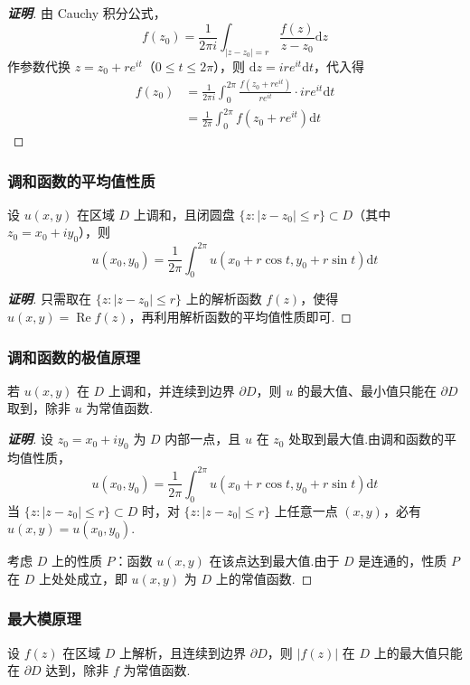 \documentclass[openany,oneside]{ctexbook}
\begin{document}
\begin{proof}[\textbf{证明}]
由 Cauchy 积分公式，
\[
f(z_0)=\frac{1}{2\pi i}\int_{|z-z_0|=r}\frac{f(z)}{z-z_0}\mathrm{d}z
\]
作参数代换 \( z=z_0+re^{it} \)（\( 0\le t\le 2\pi \)），则 \( \mathrm{d}z=ire^{it}\mathrm{d}t \)，代入得
\[
\begin{aligned}
f(z_0)&=\frac{1}{2\pi i}\int_0^{2\pi}\frac{f(z_0+re^{it})}{re^{it}}\cdot ire^{it}\mathrm{d}t\\
&=\frac{1}{2\pi}\int_0^{2\pi}f(z_0+re^{it})\mathrm{d}t
\end{aligned}
\]
\end{proof}
\subsubsection{调和函数的平均值性质}
\begin{theorem}
设 \( u(x,y) \) 在区域 \( D \) 上调和，且闭圆盘 \( \{z:|z-z_0|\le r\}\subset D \)（其中 \( z_0=x_0+iy_0 \)），则
\[
u(x_0,y_0)=\frac{1}{2\pi}\int_0^{2\pi}u(x_0+r\cos t,y_0+r\sin t)\mathrm{d}t
\]
\end{theorem}

\begin{proof}[\textbf{证明}]
只需取在 \( \{z:|z-z_0|\le r\} \) 上的解析函数 \( f(z) \)，使得 \( u(x,y)=\operatorname{Re}f(z) \)，再利用解析函数的平均值性质即可.
\end{proof}
\subsubsection{调和函数的极值原理}
\begin{theorem}
若 \( u(x,y) \) 在 \( D \) 上调和，并连续到边界 \( \partial D \)，则 \( u \) 的最大值、最小值只能在 \( \partial D \) 取到，除非 \( u \) 为常值函数.
\end{theorem}

\begin{proof}[\textbf{证明}]
设 \( z_0=x_0+iy_0 \) 为 \( D \) 内部一点，且 \( u \) 在 \( z_0 \) 处取到最大值.由调和函数的平均值性质，
\[
u(x_0,y_0)=\frac{1}{2\pi}\int_0^{2\pi}u(x_0+r\cos t,y_0+r\sin t)\mathrm{d}t
\]
当 \( \{z:|z-z_0|\le r\}\subset D \) 时，对 \( \{z:|z-z_0|\le r\} \) 上任意一点 \( (x,y) \)，必有 \( u(x,y)=u(x_0,y_0) \).

考虑 \( D \) 上的性质 \( P \)：函数 \( u(x,y) \) 在该点达到最大值.由于 \( D \) 是连通的，性质 \( P \) 在 \( D \) 上处处成立，即 \( u(x,y) \) 为 \( D \) 上的常值函数.
\end{proof}
\subsubsection{最大模原理}
\begin{theorem}
设 \( f(z) \) 在区域 \( D \) 上解析，且连续到边界 \( \partial D \)，则 \( |f(z)| \) 在 \( D \) 上的最大值只能在 \( \partial D \) 达到，除非 \( f \) 为常值函数.
\end{theorem}
\end{document}
